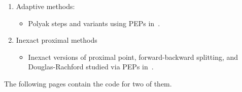 \documentclass[11pt,a4paper]{article}
\begin{document}
\begin{enumerate}
\begin{itemize}
						\end{itemize}
						\item Adaptive methods:
						\begin{itemize}
							\item Polyak steps and variants using PEPs in~\cite{Barre2020Polyak}.
						\end{itemize}
						\item Inexact proximal methods
						\begin{itemize}
							\item Inexact versions of proximal point, forward-backward splitting, and Douglas-Rachford studied via PEPs in~\cite{Barre2020inexact}.
						\end{itemize}
					\end{enumerate}
					
					The following pages contain the code for two of them.
					\clearpage
\end{document}
